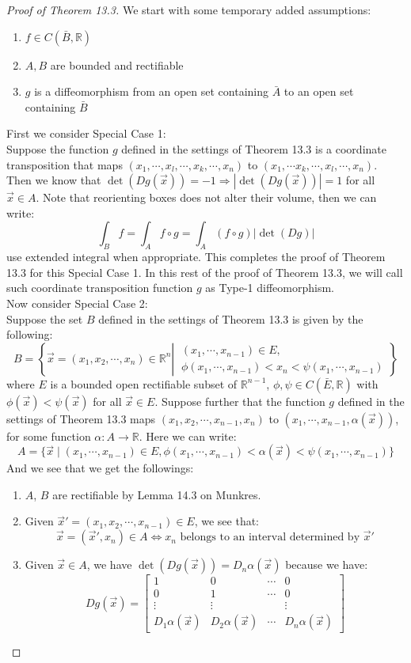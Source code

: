 \documentclass[15pt]{book}
\theoremstyle{break}
\theoremstyle{break}
\newcommand{\R}{\mathbb{R}}
\newcommand{\bmat}[1]{\begin{bmatrix} #1 \end{bmatrix}}
\begin{document}
\begin{proof}[Proof of Theorem 13.3]
\hfill\break
We start with some temporary added assumptions:
\begin{enumerate}[topsep=3pt,itemsep=-1ex,partopsep=1ex,parsep=1ex]
\item $f \in C(\bar{B},\R)$
\item $A,B$ are bounded and rectifiable
\item $g$ is a diffeomorphism from an open set containing $\bar{A}$ to an open set containing $\bar{B}$
\end{enumerate}

First we consider Special Case 1: \\
Suppose the function $g$ defined in the settings of Theorem 13.3 is a coordinate transposition that maps $(x_1,\cdots, x_l,\cdots,x_k,\cdots,x_n)$ to $(x_1,\cdots x_k, \cdots, x_l, \cdots, x_n)$. Then we know that $\det (Dg(\vec{x})) = -1 \Rightarrow |\det (Dg(\vec{x}))| =1$ for all $\vec{x}\in A$. Note that reorienting boxes does not alter their volume, then we can write:
$$\int_B f = \int_A f\circ g = \int_A (f\circ g)|\det(Dg)|$$ use extended integral when appropriate. This completes the proof of Theorem 13.3 for this Special Case 1. In this rest of the proof of Theorem 13.3, we will call such coordinate transposition function $g$ as Type-1 diffeomorphism.\\


Now consider Special Case 2: \\
Suppose the set $B$ defined in the settings of Theorem 13.3 is given by the following: 
$$B = \left\{ \vec{x}=(x_1,x_2,\cdots,x_n)\in \R^n\left|\ \substack{(x_1,\cdots, x_{n-1}) \in E,\\ \phi(x_1,\cdots, x_{n-1}) < x_n < \psi(x_1,\cdots, x_{n-1})}\right.\right\}$$
where $E$ is a bounded open rectifiable subset of $\R^{n-1}$, $\phi,\psi \in C(\bar{E}, \R)$ with $\phi(\vec{x}) < \psi(\vec{x}) $ for all $\vec{x}\in E$. Suppose further that the function $g$ defined in the settings of Theorem 13.3 maps $(x_1,x_2,\cdots, x_{n-1}, x_n)$ to $(x_1,\cdots, x_{n-1}, \alpha(\vec{x}))$, for some function $\alpha:A \to \R$. Here we can write: 
$$A = \{ \vec{x}\mid (x_1,\cdots,x_{n-1}) \in E , \phi(x_1,\cdots, x_{n-1}) < \alpha(\vec{x}) < \psi(x_1,\cdots,x_{n-1})\}$$
And we see that we get the followings:
\begin{enumerate}[topsep=3pt,itemsep=-1ex,partopsep=1ex,parsep=1ex]
\item $A$, $B$ are rectifiable by Lemma 14.3 on Munkres.
\item Given $\vec{x}' = (x_1,x_2,\cdots, x_{n-1}) \in E$, we see that: $$\vec{x}=(\vec{x}',x_n) \in A \iff x_n \text{ belongs to an interval determined by } \vec{x}'$$
\item Given $\vec{x}\in A$, we have $\det(Dg(\vec{x})) = D_n\alpha(\vec{x})$ because we have:
$$Dg(\vec{x})= \bmat{1&0&\cdots&0 \\ 0 & 1 & \cdots & 0 \\ \vdots &\vdots & &\vdots \\ D_1\alpha(\vec{x})& D_2\alpha(\vec{x}) &\cdots &D_n \alpha(\vec{x})}$$
\end{enumerate}


\end{proof}
\end{document}

